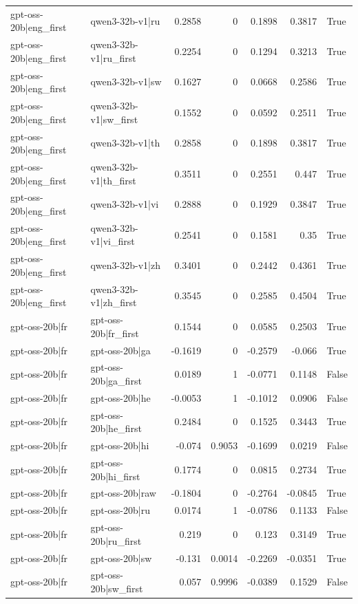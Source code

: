 \begin{table}
\begin{tabular}{l l r r r r l}
gpt-oss-20b|eng_first & qwen3-32b-v1|ru & 0.2858 & 0 & 0.1898 & 0.3817 & True \\
gpt-oss-20b|eng_first & qwen3-32b-v1|ru_first & 0.2254 & 0 & 0.1294 & 0.3213 & True \\
gpt-oss-20b|eng_first & qwen3-32b-v1|sw & 0.1627 & 0 & 0.0668 & 0.2586 & True \\
gpt-oss-20b|eng_first & qwen3-32b-v1|sw_first & 0.1552 & 0 & 0.0592 & 0.2511 & True \\
gpt-oss-20b|eng_first & qwen3-32b-v1|th & 0.2858 & 0 & 0.1898 & 0.3817 & True \\
gpt-oss-20b|eng_first & qwen3-32b-v1|th_first & 0.3511 & 0 & 0.2551 & 0.447 & True \\
gpt-oss-20b|eng_first & qwen3-32b-v1|vi & 0.2888 & 0 & 0.1929 & 0.3847 & True \\
gpt-oss-20b|eng_first & qwen3-32b-v1|vi_first & 0.2541 & 0 & 0.1581 & 0.35 & True \\
gpt-oss-20b|eng_first & qwen3-32b-v1|zh & 0.3401 & 0 & 0.2442 & 0.4361 & True \\
gpt-oss-20b|eng_first & qwen3-32b-v1|zh_first & 0.3545 & 0 & 0.2585 & 0.4504 & True \\
gpt-oss-20b|fr & gpt-oss-20b|fr_first & 0.1544 & 0 & 0.0585 & 0.2503 & True \\
gpt-oss-20b|fr & gpt-oss-20b|ga & -0.1619 & 0 & -0.2579 & -0.066 & True \\
gpt-oss-20b|fr & gpt-oss-20b|ga_first & 0.0189 & 1 & -0.0771 & 0.1148 & False \\
gpt-oss-20b|fr & gpt-oss-20b|he & -0.0053 & 1 & -0.1012 & 0.0906 & False \\
gpt-oss-20b|fr & gpt-oss-20b|he_first & 0.2484 & 0 & 0.1525 & 0.3443 & True \\
gpt-oss-20b|fr & gpt-oss-20b|hi & -0.074 & 0.9053 & -0.1699 & 0.0219 & False \\
gpt-oss-20b|fr & gpt-oss-20b|hi_first & 0.1774 & 0 & 0.0815 & 0.2734 & True \\
gpt-oss-20b|fr & gpt-oss-20b|raw & -0.1804 & 0 & -0.2764 & -0.0845 & True \\
gpt-oss-20b|fr & gpt-oss-20b|ru & 0.0174 & 1 & -0.0786 & 0.1133 & False \\
gpt-oss-20b|fr & gpt-oss-20b|ru_first & 0.219 & 0 & 0.123 & 0.3149 & True \\
gpt-oss-20b|fr & gpt-oss-20b|sw & -0.131 & 0.0014 & -0.2269 & -0.0351 & True \\
gpt-oss-20b|fr & gpt-oss-20b|sw_first & 0.057 & 0.9996 & -0.0389 & 0.1529 & False \\

\end{tabular}
\end{table}
